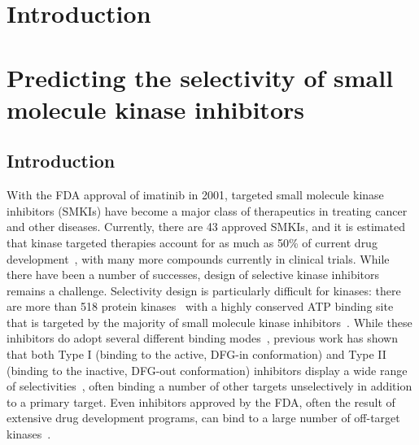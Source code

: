 \documentclass[phd,tocprelim]{cornell}
\begin{document}
\contentspage
\tablelistpage
\figurelistpage


\normalspacing \setcounter{page}{1} 
\pagestyle{cornell} \addtolength{\parskip}{0.5\baselineskip}

\chapter{Introduction}
\chapter{Predicting the selectivity of small molecule kinase inhibitors}
\section{Introduction}
With the FDA approval of imatinib in 2001, targeted small molecule kinase inhibitors (SMKIs) have become a major class of therapeutics in treating cancer and other diseases. Currently, there are 43\citep{fda-approved-kinase-inhibitors} approved SMKIs, and it is estimated that kinase targeted therapies account for as much as 50\% of current drug development~\citep{Santos:Nat.Rev.DrugDiscov.:2016}, with many more compounds currently in clinical trials. While there have been a number of successes, design of selective kinase inhibitors remains a challenge. Selectivity design is particularly difficult for kinases: there are more than 518 protein kinases~\citep{Volkamer2015-jx,Manning2002-cw} with a highly conserved ATP binding site that is targeted by the majority of small molecule kinase inhibitors~\citep{Wu2015-oq}. While these inhibitors do adopt several different binding modes~\citep{Cowan-Jacob2007-rn,Seeliger2007-jn,Huse2002-ml,Harrison2003-ct}, previous work has shown that both Type I (binding to the active, DFG-in conformation) and Type II (binding to the inactive, DFG-out conformation) inhibitors display a wide range of selectivities~\citep{Anastassiadis2011-sm,Davis:Nat.Biotechnol.:2011}, often binding a number of other targets unselectively in addition to a primary target. Even inhibitors approved by the FDA, often the result of extensive drug development programs, can bind to a large number of off-target kinases~\citep{Klaeger2017-jr}.
\end{document}
